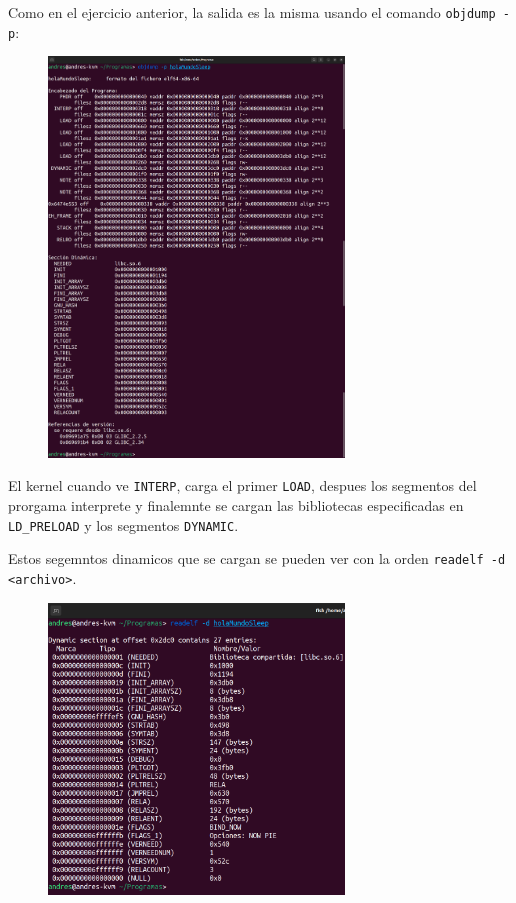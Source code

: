 \documentclass{article}
\begin{document}
Como en el ejercicio anterior, la salida es la misma usando el comando \verb|objdump -p|:

\begin{figure}[H]
    \centering
    \includegraphics[width=0.7\textwidth]{imagenes/objdumppsleep.png}
\end{figure}

El kernel cuando ve \texttt{INTERP}, carga el primer \texttt{LOAD}, despues los segmentos del prorgama interprete y finalemnte se cargan las bibliotecas especificadas en \texttt{LD\_PRELOAD} y los segmentos \texttt{DYNAMIC}. 

\bigskip

Estos segemntos dinamicos que se cargan se pueden ver con la orden \verb|readelf -d <archivo>|.

\begin{figure}[H]
    \centering
    \includegraphics[width=0.7\textwidth]{imagenes/Captura desde 2022-11-17 18-47-41.png}
\end{figure}
\end{document}
